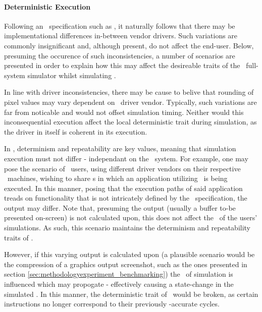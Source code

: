 \paragraph{Deterministic Execution}
\label{par:futurework_simicsproductification_deterministicexecution}
Following an \dvttermapi\ specification such as \dvttermopengles , it naturally follows that there may be implementational differences in-between vendor drivers.
Such variations are commonly insignificant and, although present, do not affect the end-user.
Below, presuming the occurence of such inconsistencies, a number of scenarios are presented in order to explain how this may affect the desireable traits of the \dvttermsimics\ full-system simulator whilst simulating \dvttermopengles .

In line with driver inconsistencies, there may be cause to belive that rounding of pixel values may vary dependent on \dvttermhost\ driver vendor.
Typically, such variations are far from noticable and would not offset simulation timing.
Neither would this inconsequential execution affect the local deterministic trait during simulation, as the driver in itself is coherent in its execution.

In \dvttermsimics , determinism and repeatability are key values, meaning that simulation execution must not differ - independant on the \dvttermhost\ system.
For example, one may pose the scenario of \dvttermsimics\ users, using different driver vendors on their respective \dvttermhost\ machines, wishing to share \dvttermcheckpoint s in which an application utilizing \dvttermopengles\ is being executed.
In this manner, posing that the execution paths of said application treads on functionality that is not intricately defined by the \dvttermopengles\ specification, the output may differ.
Note that, presuming the output (usually a buffer to-be presented on-screen) is not calculated upon, this does not affect the \dvttermtiming\ of the users' simulations.
As such, this scenario maintains the determinism and repeatability traits of \dvttermsimics .

However, if this varying output is calculated upon (a plausible scenario would be the compression of a graphics output screenshot, such as the ones presented in section \ref{sec:methodologyexperiment_benchmarking}) the \dvttermtiming\ of simulation is influenced which may propogate - effectively causing a state-change in the simulated \dvttermcpu .
In this manner, the deterministic trait of \dvttermsimics\ would be broken, as certain instructions no longer correspond to their previously \dvttermtiming -accurate cycles.\\

